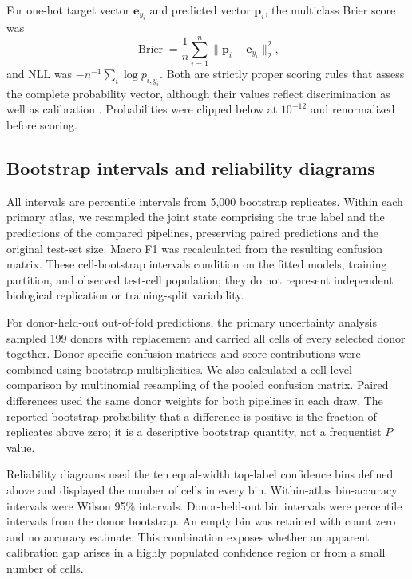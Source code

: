For one-hot target vector $\mathbf{e}_{y_i}$ and predicted vector $\mathbf{p}_i$, the multiclass Brier score was
\begin{equation}
\operatorname{Brier}=\frac{1}{n}\sum_{i=1}^{n}\lVert\mathbf{p}_i-\mathbf{e}_{y_i}\rVert_2^2,
\end{equation}
and NLL was $-n^{-1}\sum_i\log p_{i,y_i}$. Both are strictly proper scoring rules that assess the complete probability vector, although their values reflect discrimination as well as calibration \citep{Brier1950,Gneiting2007}. Probabilities were clipped below at $10^{-12}$ and renormalized before scoring.

\subsection{Bootstrap intervals and reliability diagrams}

All intervals are percentile intervals from 5,000 bootstrap replicates. Within each primary atlas, we resampled the joint state comprising the true label and the predictions of the compared pipelines, preserving paired predictions and the original test-set size. Macro F1 was recalculated from the resulting confusion matrix. These cell-bootstrap intervals condition on the fitted models, training partition, and observed test-cell population; they do not represent independent biological replication or training-split variability.

For donor-held-out out-of-fold predictions, the primary uncertainty analysis sampled 199 donors with replacement and carried all cells of every selected donor together. Donor-specific confusion matrices and score contributions were combined using bootstrap multiplicities. We also calculated a cell-level comparison by multinomial resampling of the pooled confusion matrix. Paired differences used the same donor weights for both pipelines in each draw. The reported bootstrap probability that a difference is positive is the fraction of replicates above zero; it is a descriptive bootstrap quantity, not a frequentist $P$ value.

Reliability diagrams used the ten equal-width top-label confidence bins defined above and displayed the number of cells in every bin. Within-atlas bin-accuracy intervals were Wilson 95\% intervals. Donor-held-out bin intervals were percentile intervals from the donor bootstrap. An empty bin was retained with count zero and no accuracy estimate. This combination exposes whether an apparent calibration gap arises in a highly populated confidence region or from a small number of cells.

